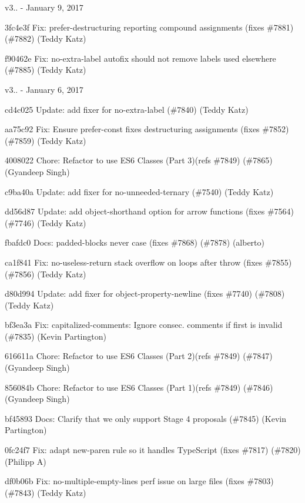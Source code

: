 v3.. -\/ January 9, 2017


\begin{DoxyItemize}
\item 3fc4e3f Fix\+: prefer-\/destructuring reporting compound assignments (fixes \#7881) (\#7882) (Teddy Katz)
\item f90462e Fix\+: no-\/extra-\/label autofix should not remove labels used elsewhere (\#7885) (Teddy Katz)
\end{DoxyItemize}

v3.. -\/ January 6, 2017


\begin{DoxyItemize}
\item cd4c025 Update\+: add fixer for no-\/extra-\/label (\#7840) (Teddy Katz)
\item aa75c92 Fix\+: Ensure prefer-\/const fixes destructuring assignments (fixes \#7852) (\#7859) (Teddy Katz)
\item 4008022 Chore\+: Refactor to use ES6 Classes (Part 3)(refs \#7849) (\#7865) (Gyandeep Singh)
\item c9ba40a Update\+: add fixer for {\ttfamily no-\/unneeded-\/ternary} (\#7540) (Teddy Katz)
\item dd56d87 Update\+: add object-\/shorthand option for arrow functions (fixes \#7564) (\#7746) (Teddy Katz)
\item fbafdc0 Docs\+: {\ttfamily padded-\/blocks} {\ttfamily never} case (fixes \#7868) (\#7878) (alberto)
\item ca1f841 Fix\+: no-\/useless-\/return stack overflow on loops after throw (fixes \#7855) (\#7856) (Teddy Katz)
\item d80d994 Update\+: add fixer for object-\/property-\/newline (fixes \#7740) (\#7808) (Teddy Katz)
\item bf3ea3a Fix\+: capitalized-\/comments\+: Ignore consec. comments if first is invalid (\#7835) (Kevin Partington)
\item 616611a Chore\+: Refactor to use ES6 Classes (Part 2)(refs \#7849) (\#7847) (Gyandeep Singh)
\item 856084b Chore\+: Refactor to use ES6 Classes (Part 1)(refs \#7849) (\#7846) (Gyandeep Singh)
\item bf45893 Docs\+: Clarify that we only support Stage 4 proposals (\#7845) (Kevin Partington)
\item 0fc24f7 Fix\+: adapt new-\/paren rule so it handles Type\+Script (fixes \#7817) (\#7820) (Philipp A)
\item df0b06b Fix\+: no-\/multiple-\/empty-\/lines perf issue on large files (fixes \#7803) (\#7843) (Teddy Katz)

\end{DoxyItemize}
